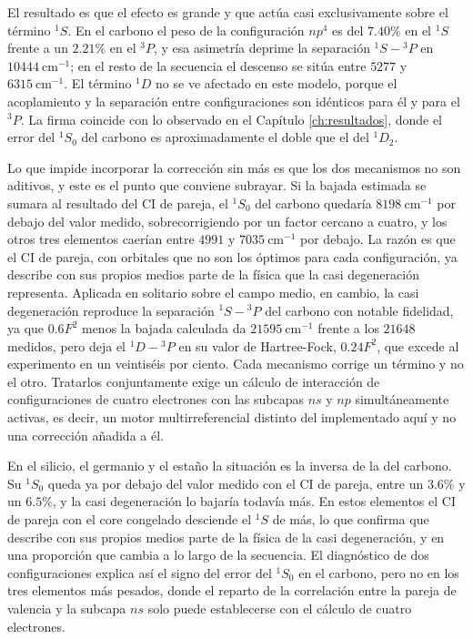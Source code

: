 El resultado es que el efecto es grande y que actúa casi exclusivamente sobre el término $^1S$. En el carbono el peso de la configuración $np^4$ es del $7.40\%$ en el $^1S$ frente a un $2.21\%$ en el $^3P$, y esa asimetría deprime la separación $^1S - {}^3P$ en $\num{10444}\ \text{cm}^{-1}$; en el resto de la secuencia el descenso se sitúa entre $\num{5277}$ y $\num{6315}\ \text{cm}^{-1}$. El término $^1D$ no se ve afectado en este modelo, porque el acoplamiento y la separación entre configuraciones son idénticos para él y para el $^3P$. La firma coincide con lo observado en el Capítulo \ref{ch:resultados}, donde el error del $^1S_0$ del carbono es aproximadamente el doble que el del $^1D_2$.

Lo que impide incorporar la corrección sin más es que los dos mecanismos no son aditivos, y este es el punto que conviene subrayar. Si la bajada estimada se sumara al resultado del CI de pareja, el $^1S_0$ del carbono quedaría $\num{8198}\ \text{cm}^{-1}$ por debajo del valor medido, sobrecorrigiendo por un factor cercano a cuatro, y los otros tres elementos caerían entre $\num{4991}$ y $\num{7035}\ \text{cm}^{-1}$ por debajo. La razón es que el CI de pareja, con orbitales que no son los óptimos para cada configuración, ya describe con sus propios medios parte de la física que la casi degeneración representa. Aplicada en solitario sobre el campo medio, en cambio, la casi degeneración reproduce la separación $^1S - {}^3P$ del carbono con notable fidelidad, ya que $0.6F^2$ menos la bajada calculada da $\num{21595}\ \text{cm}^{-1}$ frente a los $\num{21648}$ medidos, pero deja el $^1D - {}^3P$ en su valor de Hartree-Fock, $0.24F^2$, que excede al experimento en un veintiséis por ciento. Cada mecanismo corrige un término y no el otro. Tratarlos conjuntamente exige un cálculo de interacción de configuraciones de cuatro electrones con las subcapas $ns$ y $np$ simultáneamente activas, es decir, un motor multirreferencial distinto del implementado aquí y no una corrección añadida a él.

En el silicio, el germanio y el estaño la situación es la inversa de la del carbono. Su $^1S_0$ queda ya por debajo del valor medido con el CI de pareja, entre un $3.6\%$ y un $6.5\%$, y la casi degeneración lo bajaría todavía más. En estos elementos el CI de pareja con el core congelado desciende el $^1S$ de más, lo que confirma que describe con sus propios medios parte de la física de la casi degeneración, y en una proporción que cambia a lo largo de la secuencia. El diagnóstico de dos configuraciones explica así el signo del error del $^1S_0$ en el carbono, pero no en los tres elementos más pesados, donde el reparto de la correlación entre la pareja de valencia y la subcapa $ns$ solo puede establecerse con el cálculo de cuatro electrones.


